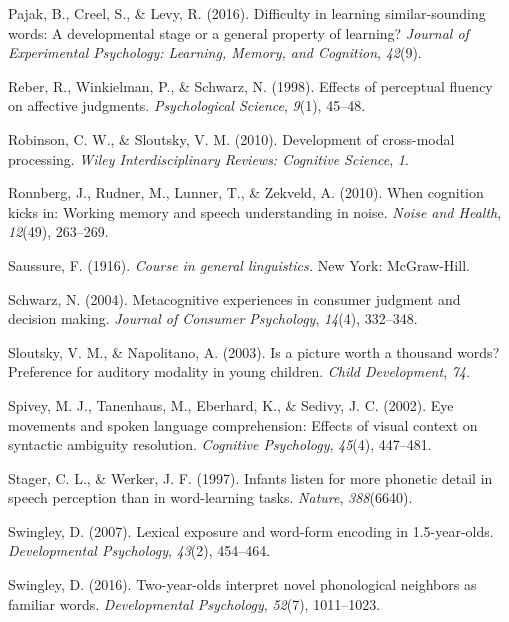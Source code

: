 \documentclass[english,man]{apa6}
\theoremstyle{definition}
\theoremstyle{definition}
\theoremstyle{definition}
\theoremstyle{remark}
\begin{document}
\hypertarget{ref-pajak2016}{}
Pajak, B., Creel, S., \& Levy, R. (2016). Difficulty in learning
similar-sounding words: A developmental stage or a general property of
learning? \emph{Journal of Experimental Psychology: Learning, Memory,
and Cognition}, \emph{42}(9).

\hypertarget{ref-reber98}{}
Reber, R., Winkielman, P., \& Schwarz, N. (1998). Effects of perceptual
fluency on affective judgments. \emph{Psychological Science},
\emph{9}(1), 45--48.

\hypertarget{ref-robinson2010}{}
Robinson, C. W., \& Sloutsky, V. M. (2010). Development of cross-modal
processing. \emph{Wiley Interdisciplinary Reviews: Cognitive Science},
\emph{1}.

\hypertarget{ref-Ronnberg10}{}
Ronnberg, J., Rudner, M., Lunner, T., \& Zekveld, A. (2010). When
cognition kicks in: Working memory and speech understanding in noise.
\emph{Noise and Health}, \emph{12}(49), 263--269.

\hypertarget{ref-saussure1916}{}
Saussure, F. (1916). \emph{Course in general linguistics.} New York:
McGraw-Hill.

\hypertarget{ref-schwarz2004}{}
Schwarz, N. (2004). Metacognitive experiences in consumer judgment and
decision making. \emph{Journal of Consumer Psychology}, \emph{14}(4),
332--348.

\hypertarget{ref-sloutsky2003}{}
Sloutsky, V. M., \& Napolitano, A. (2003). Is a picture worth a thousand
words? Preference for auditory modality in young children. \emph{Child
Development}, \emph{74}.

\hypertarget{ref-spivey2002}{}
Spivey, M. J., Tanenhaus, M., Eberhard, K., \& Sedivy, J. C. (2002). Eye
movements and spoken language comprehension: Effects of visual context
on syntactic ambiguity resolution. \emph{Cognitive Psychology},
\emph{45}(4), 447--481.

\hypertarget{ref-stager1997}{}
Stager, C. L., \& Werker, J. F. (1997). Infants listen for more phonetic
detail in speech perception than in word-learning tasks. \emph{Nature},
\emph{388}(6640).

\hypertarget{ref-Swingley2007}{}
Swingley, D. (2007). Lexical exposure and word-form encoding in
1.5-year-olds. \emph{Developmental Psychology}, \emph{43}(2), 454--464.

\hypertarget{ref-Swingley2016}{}
Swingley, D. (2016). Two-year-olds interpret novel phonological
neighbors as familiar words. \emph{Developmental Psychology},
\emph{52}(7), 1011--1023.
\end{document}
